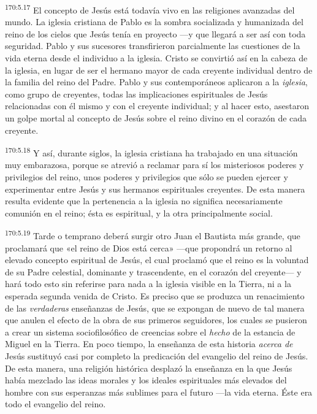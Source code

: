 \par 
\textsuperscript{170:5.17} El concepto de Jesús está todavía vivo en las religiones avanzadas del mundo. La iglesia cristiana de Pablo es la sombra socializada y humanizada del reino de los cielos que Jesús tenía en proyecto ---y que llegará a ser así con toda seguridad. Pablo y sus sucesores transfirieron parcialmente las cuestiones de la vida eterna desde el individuo a la iglesia. Cristo se convirtió así en la cabeza de la iglesia, en lugar de ser el hermano mayor de cada creyente individual dentro de la familia del reino del Padre. Pablo y sus contemporáneos aplicaron a la \textit{iglesia}, como grupo de creyentes, todas las implicaciones espirituales de Jesús relacionadas con él mismo y con el creyente individual; y al hacer esto, asestaron un golpe mortal al concepto de Jesús sobre el reino divino en el corazón de cada creyente.

\par 
\textsuperscript{170:5.18} Y así, durante siglos, la iglesia cristiana ha trabajado en una situación muy embarazosa, porque se atrevió a reclamar para sí los misteriosos poderes y privilegios del reino, unos poderes y privilegios que sólo se pueden ejercer y experimentar entre Jesús y sus hermanos espirituales creyentes. De esta manera resulta evidente que la pertenencia a la iglesia no significa necesariamente comunión en el reino; ésta es espiritual, y la otra principalmente social.

\par 
\textsuperscript{170:5.19} Tarde o temprano deberá surgir otro Juan el Bautista más grande, que proclamará que «el reino de Dios está cerca» ---que propondrá un retorno al elevado concepto espiritual de Jesús, el cual proclamó que el reino es la voluntad de su Padre celestial, dominante y trascendente, en el corazón del creyente--- y hará todo esto sin referirse para nada a la iglesia visible en la Tierra, ni a la esperada segunda venida de Cristo. Es preciso que se produzca un renacimiento de las \textit{verdaderas} enseñanzas de Jesús, que se expongan de nuevo de tal manera que anulen el efecto de la obra de sus primeros seguidores, los cuales se pusieron a crear un sistema sociofilosófico de creencias sobre el \textit{hecho} de la estancia de Miguel en la Tierra. En poco tiempo, la enseñanza de esta historia \textit{acerca de} Jesús sustituyó casi por completo la predicación del evangelio del reino de Jesús. De esta manera, una religión histórica desplazó la enseñanza en la que Jesús había mezclado las ideas morales y los ideales espirituales más elevados del hombre con sus esperanzas más sublimes para el futuro ---la vida eterna. Éste era todo el evangelio del reino.

